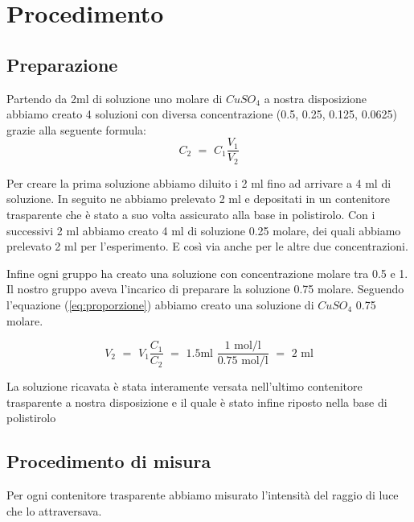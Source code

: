 \section{Procedimento}

\subsection{Preparazione}

Partendo da 2ml di soluzione uno molare di $CuSO_4$ a nostra disposizione abbiamo creato 4 soluzioni con diversa concentrazione (0.5, 0.25, 0.125, 0.0625) grazie alla seguente formula:
\begin{equation}\label{eq:proporzione}
	C_2 \,\, = \,\, C_1 \frac{V_1}{V_2}
\end{equation}

Per creare la prima soluzione abbiamo diluito i 2 ml fino ad arrivare a 4 ml di soluzione. In seguito ne abbiamo prelevato 2 ml e depositati in un contenitore trasparente che è stato a suo volta assicurato alla base in polistirolo. Con i successivi 2 ml abbiamo creato 4 ml di soluzione 0.25 molare, dei quali abbiamo prelevato 2 ml per l'esperimento. E così via anche per le altre due concentrazioni.


Infine ogni gruppo ha creato una soluzione con concentrazione molare tra 0.5 e 1. Il nostro gruppo aveva l'incarico di preparare la soluzione 0.75 molare.
Seguendo l'equazione (\ref{eq:proporzione}) abbiamo creato una soluzione di $CuSO_4$ 0.75 molare.

\begin{equation}
	V_2 \,\, = \,\, V_1 \frac{C_1}{C_2} \,\, = \,\, 1.5 \si{\milli\litre} \,\, \frac{1 \,\, \si{\mole\per\litre}}{0.75 \,\, \si{\mole\per\litre}} \,\, = \,\, 2 \,\, \si{\milli\litre}
\end{equation}

La soluzione ricavata è stata interamente versata nell'ultimo contenitore trasparente a nostra disposizione e il quale è stato infine riposto nella base di polistirolo

\subsection{Procedimento di misura}

Per ogni contenitore trasparente abbiamo misurato l'intensità del raggio di luce che lo attraversava.

